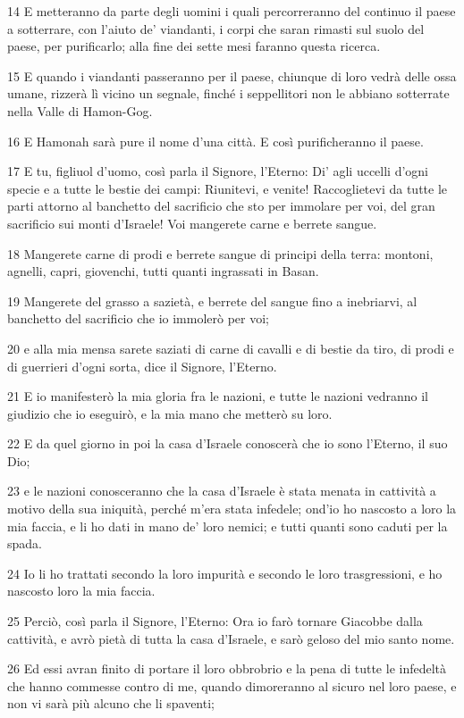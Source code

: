 \par 14 E metteranno da parte degli uomini i quali percorreranno del continuo il paese a sotterrare, con l'aiuto de' viandanti, i corpi che saran rimasti sul suolo del paese, per purificarlo; alla fine dei sette mesi faranno questa ricerca.
\par 15 E quando i viandanti passeranno per il paese, chiunque di loro vedrà delle ossa umane, rizzerà lì vicino un segnale, finché i seppellitori non le abbiano sotterrate nella Valle di Hamon-Gog.
\par 16 E Hamonah sarà pure il nome d'una città. E così purificheranno il paese.
\par 17 E tu, figliuol d'uomo, così parla il Signore, l'Eterno: Di' agli uccelli d'ogni specie e a tutte le bestie dei campi: Riunitevi, e venite! Raccoglietevi da tutte le parti attorno al banchetto del sacrificio che sto per immolare per voi, del gran sacrificio sui monti d'Israele! Voi mangerete carne e berrete sangue.
\par 18 Mangerete carne di prodi e berrete sangue di principi della terra: montoni, agnelli, capri, giovenchi, tutti quanti ingrassati in Basan.
\par 19 Mangerete del grasso a sazietà, e berrete del sangue fino a inebriarvi, al banchetto del sacrificio che io immolerò per voi;
\par 20 e alla mia mensa sarete saziati di carne di cavalli e di bestie da tiro, di prodi e di guerrieri d'ogni sorta, dice il Signore, l'Eterno.
\par 21 E io manifesterò la mia gloria fra le nazioni, e tutte le nazioni vedranno il giudizio che io eseguirò, e la mia mano che metterò su loro.
\par 22 E da quel giorno in poi la casa d'Israele conoscerà che io sono l'Eterno, il suo Dio;
\par 23 e le nazioni conosceranno che la casa d'Israele è stata menata in cattività a motivo della sua iniquità, perché m'era stata infedele; ond'io ho nascosto a loro la mia faccia, e li ho dati in mano de' loro nemici; e tutti quanti sono caduti per la spada.
\par 24 Io li ho trattati secondo la loro impurità e secondo le loro trasgressioni, e ho nascosto loro la mia faccia.
\par 25 Perciò, così parla il Signore, l'Eterno: Ora io farò tornare Giacobbe dalla cattività, e avrò pietà di tutta la casa d'Israele, e sarò geloso del mio santo nome.
\par 26 Ed essi avran finito di portare il loro obbrobrio e la pena di tutte le infedeltà che hanno commesse contro di me, quando dimoreranno al sicuro nel loro paese, e non vi sarà più alcuno che li spaventi;
